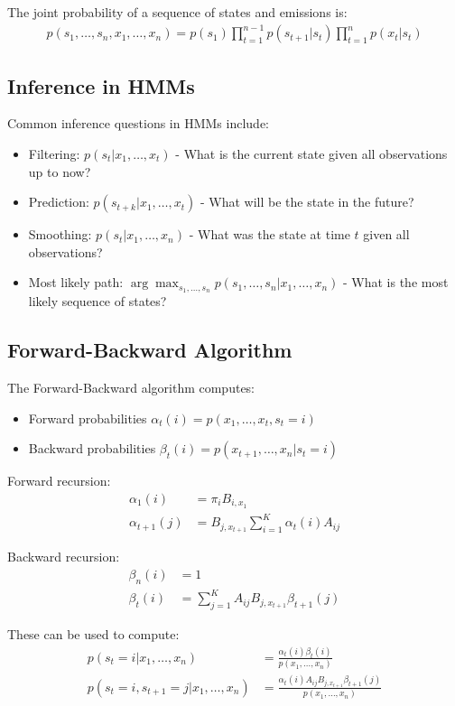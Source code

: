 \documentclass{article}
\begin{document}
The joint probability of a sequence of states and emissions is:
\begin{align}
p(s_1, \ldots, s_n, x_1, \ldots, x_n) = p(s_1)\prod_{t=1}^{n-1}p(s_{t+1}|s_t)\prod_{t=1}^{n}p(x_t|s_t)
\end{align}

\subsection{Inference in HMMs}
Common inference questions in HMMs include:
\begin{itemize}
\item Filtering: $p(s_t|x_1, \ldots, x_t)$ - What is the current state given all observations up to now?
\item Prediction: $p(s_{t+k}|x_1, \ldots, x_t)$ - What will be the state in the future?
\item Smoothing: $p(s_t|x_1, \ldots, x_n)$ - What was the state at time $t$ given all observations?
\item Most likely path: $\arg\max_{s_1, \ldots, s_n} p(s_1, \ldots, s_n|x_1, \ldots, x_n)$ - What is the most likely sequence of states?
\end{itemize}

\subsection{Forward-Backward Algorithm}
The Forward-Backward algorithm computes:
\begin{itemize}
\item Forward probabilities $\alpha_t(i) = p(x_1, \ldots, x_t, s_t = i)$
\item Backward probabilities $\beta_t(i) = p(x_{t+1}, \ldots, x_n|s_t = i)$
\end{itemize}

Forward recursion:
\begin{align}
\alpha_1(i) &= \pi_i B_{i,x_1}\\
\alpha_{t+1}(j) &= B_{j,x_{t+1}}\sum_{i=1}^{K}\alpha_t(i)A_{ij}
\end{align}

Backward recursion:
\begin{align}
\beta_n(i) &= 1\\
\beta_t(i) &= \sum_{j=1}^{K}A_{ij}B_{j,x_{t+1}}\beta_{t+1}(j)
\end{align}

These can be used to compute:
\begin{align}
p(s_t = i|x_1, \ldots, x_n) &= \frac{\alpha_t(i)\beta_t(i)}{p(x_1, \ldots, x_n)}\\
p(s_t = i, s_{t+1} = j|x_1, \ldots, x_n) &= \frac{\alpha_t(i)A_{ij}B_{j,x_{t+1}}\beta_{t+1}(j)}{p(x_1, \ldots, x_n)}
\end{align}
\end{document}
